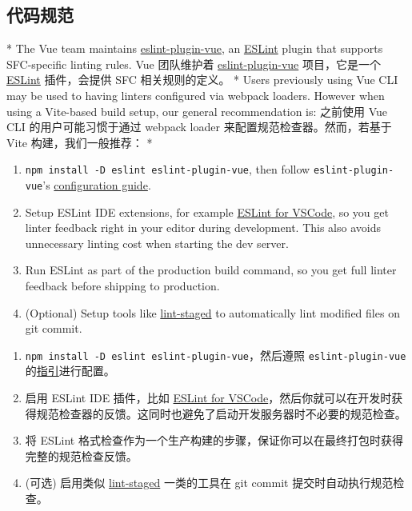 \begin{paracol}{2}
\subsection{代码规范}
\switchcolumn[0]*%
The Vue team maintains
\href{https://github.com/vuejs/eslint-plugin-vue}{eslint-plugin-vue}, an
\href{https://eslint.org/}{ESLint} plugin that supports SFC-specific
linting rules.
\switchcolumn
Vue 团队维护着
\href{https://github.com/vuejs/eslint-plugin-vue}{eslint-plugin-vue}
项目，它是一个 \href{https://eslint.org/}{ESLint} 插件，会提供 SFC
相关规则的定义。
\switchcolumn[0]*%
Users previously using Vue CLI may be used to having linters configured
via webpack loaders. However when using a Vite-based build setup, our
general recommendation is:
\switchcolumn
之前使用 Vue CLI 的用户可能习惯于通过 webpack loader
来配置规范检查器。然而，若基于 Vite 构建，我们一般推荐：
\switchcolumn[0]*%
\begin{enumerate}
\item
  \texttt{npm\ install\ -D\ eslint\ eslint-plugin-vue}, then follow
  \texttt{eslint-plugin-vue}'s
  \href{https://eslint.vuejs.org/user-guide/\#usage}{configuration
  guide}.
\item
  Setup ESLint IDE extensions, for example
  \href{https://marketplace.visualstudio.com/items?itemName=dbaeumer.vscode-eslint}{ESLint
  for VSCode}, so you get linter feedback right in your editor during
  development. This also avoids unnecessary linting cost when starting
  the dev server.
\item
  Run ESLint as part of the production build command, so you get full
  linter feedback before shipping to production.
\item
  (Optional) Setup tools like
  \href{https://github.com/okonet/lint-staged}{lint-staged} to
  automatically lint modified files on git commit.
\end{enumerate}
\switchcolumn
\begin{enumerate}
\item
  \texttt{npm\ install\ -D\ eslint\ eslint-plugin-vue}，然后遵照
  \texttt{eslint-plugin-vue}
  的\href{https://eslint.vuejs.org/user-guide/\#usage}{指引}进行配置。
\item
  启用 ESLint IDE 插件，比如
  \href{https://marketplace.visualstudio.com/items?itemName=dbaeumer.vscode-eslint}{ESLint
  for
  VSCode}，然后你就可以在开发时获得规范检查器的反馈。这同时也避免了启动开发服务器时不必要的规范检查。
\item
  将 ESLint
  格式检查作为一个生产构建的步骤，保证你可以在最终打包时获得完整的规范检查反馈。
\item
  (可选) 启用类似
  \href{https://github.com/okonet/lint-staged}{lint-staged} 一类的工具在
  git commit 提交时自动执行规范检查。
\end{enumerate}
\end{paracol}

